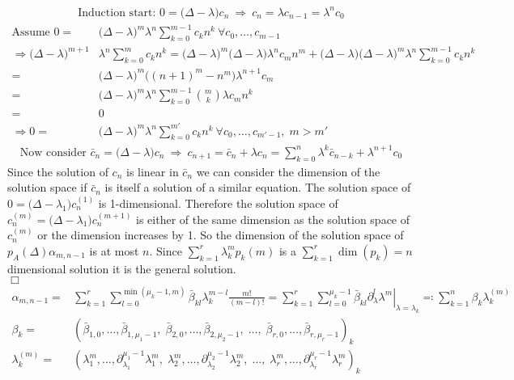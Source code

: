\documentclass[12pt]{article}
\newcommand{\del}{\partial}
\begin{document}
\begin{align*}
\text{Induction start: } 0 = \big( \Delta - \lambda \big) c_n\ \Rightarrow\ c_n = \lambda c_{n-1} = \lambda^n c_0
\end{align*}
\begin{align*}
\text{Assume } 0 =& \big( \Delta - \lambda \big)^m \lambda^n \sum_{k=0}^{m-1} c_k n^k \ \forall c_0, \dots, c_{m-1}\\
\Rightarrow \big( \Delta - \lambda \big)^{m+1} &\lambda^n \sum_{k=0}^m c_k n^k = \big( \Delta - \lambda \big)^m \big( \Delta - \lambda \big) \lambda^n c_m n^m + \big( \Delta - \lambda \big) \big( \Delta - \lambda \big)^m \lambda^n \sum_{k=0}^{m-1} c_k n^k\\
=& \big( \Delta - \lambda \big)^m \big( (n+1)^m - n^m \big) \lambda^{n+1} c_m \\
=& \big( \Delta - \lambda \big)^m \lambda^n \sum_{k=0}^{m-1} \binom mk \lambda c_m n^k\\
=& 0\\
\Rightarrow 0 =& \big( \Delta - \lambda \big)^m \lambda^n \sum_{k=0}^{m'} c_k n^k \ \forall c_0, \dots, c_{m'-1},\; m>m'
\end{align*}
\begin{align*}
\text{Now consider } \bar c_n = \big(\Delta - \lambda\big) c_n\ \Rightarrow\ c_{n+1} = \bar c_n + \lambda c_n = \sum_{k=0}^n \lambda^k \bar c_{n-k} + \lambda^{n+1} c_0
\end{align*}
Since the solution of $c_n$ is linear in $\bar c_n$ we can consider the dimension of the solution space if $\bar c_n$ is itself a solution of a similar equation. The solution space of $0 = \big(\Delta - \lambda_1\big) c_n^{(1)}$ is 1-dimensional. Therefore the solution space of $c_n^{(m)} = \big(\Delta - \lambda_1\big) c_n^{(m+1)}$ is either of the same dimension as the solution space of $c_n^{(m)}$ or the dimension increases by 1. So the dimension of the solution space of $p_A(\Delta) \alpha_{m, n-1}$ is at most $n$. Since $\sum_{k=1}^r \lambda_k^m p_k(m)$ is a $\sum_{k=1}^r \dim(p_k) = n$ dimensional solution it is the general solution.\\
\null\hfill$\Box$
\begin{align}
\alpha_{m,n-1} =& \sum_{k=1}^r \sum_{l=0}^{\min(\mu_k-1,m)} \bar\beta_{kl} \lambda_k^{m-l} \frac{m!}{(m-l)!} = \sum_{k=1}^r \sum_{l=0}^{\mu_k-1} \bar\beta_{kl} \left. \del_\lambda^l \lambda^m \right|_{\lambda = \lambda_k} \eqqcolon \sum_{k=1}^n \beta_k \lambda_k^{(m)}\\
\beta_k =& (\bar\beta_{1,0}, \dots, \bar\beta_{1,\mu_1-1},\; \bar\beta_{2,0}, \dots, \bar\beta_{2,\mu_2-1},\; \dots,\; \bar\beta_{r,0}, \dots, \bar\beta_{r,\mu_r-1})_k \nonumber\\
\lambda_k^{(m)} =& (\lambda_1^m, \dots, \del_{\lambda_1}^{\mu_1-1} \lambda_1^m,\; \lambda_2^m, \dots, \del_{\lambda_2}^{\mu_2-1} \lambda_2^m,\; \dots,\; \lambda_r^m, \dots, \del_{\lambda_r}^{\mu_r-1} \lambda_r^m)_k \nonumber
\end{align}
\end{document}
